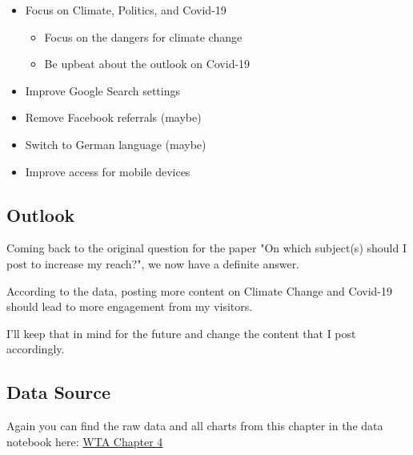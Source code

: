 \begin{itemize}
\item Focus on Climate, Politics, and Covid-19
\begin{itemize}
\item Focus on the dangers for climate change
\item Be upbeat about the outlook on Covid-19
\end{itemize}
\item Improve Google Search settings 
\item Remove Facebook referrals (maybe)
\item Switch to German language (maybe)
\item Improve access for mobile devices
\end{itemize}

\subsection{Outlook}

Coming back to the original question for the paper "On which subject(s) should I post to increase my reach?", we now have a definite answer.

According to the data, posting more content on Climate Change and Covid-19 should lead to more engagement from my visitors.

I'll keep that in mind for the future and change the content that I post accordingly.

\subsection{Data Source}

Again you can find the raw data and all charts from this chapter in the data notebook here: \href{https://count.co/n/CvJzzrqBsNI}{WTA Chapter 4}

